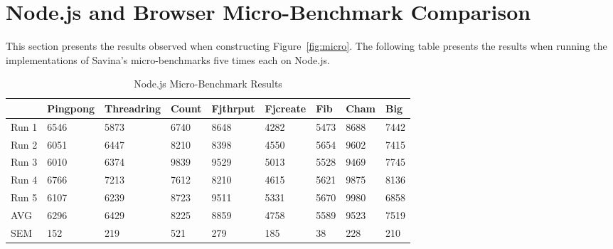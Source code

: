\documentclass[oneside]{um-fict}
\begin{document}
\section{Node.js and Browser Micro-Benchmark Comparison}
This section presents the results observed when constructing Figure~\ref{fig:micro}. The following table presents the results when running the implementations of Savina's micro-benchmarks five times each on Node.js.
\begin{table}[H]
    \begin{center}
    \begin{tabular}{|l|llllllll|}
    \hline
          & Pingpong & Threadring & Count  & Fjthrput & Fjcreate & Fib    & Cham & Big    \\ \hline
    Run 1 & 6546     & 5873       & 6740   & 8648     & 4282     & 5473   & 8688      & 7442   \\
    Run 2 & 6051     & 6447       & 8210   & 8398     & 4550     & 5654   & 9602      & 7415   \\
    Run 3 & 6010     & 6374       & 9839   & 9529     & 5013     & 5528   & 9469      & 7745   \\
    Run 4 & 6766     & 7213       & 7612   & 8210     & 4615     & 5621   & 9875      & 8136   \\
    Run 5 & 6107     & 6239       & 8723   & 9511     & 5331     & 5670   & 9980      & 6858   \\ \hline
    AVG   & 6296   & 6429     & 8225 & 8859   & 4758   & 5589 & 9523    & 7519 \\
    SEM   & 152   & 219     & 521 & 279   & 185   & 38  & 228    & 210  \\ \hline
    \end{tabular}
    \caption{Node.js Micro-Benchmark Results}\label{tab:nodemicro}
\end{center}
\end{table}
\end{document}
